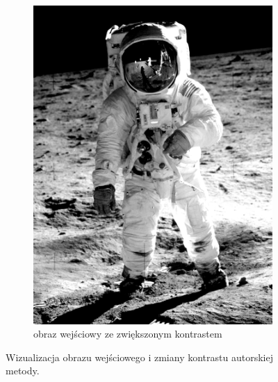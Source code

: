 \begin{figure}[htb]
\begin{subfigure}{0.49\textwidth}
            \includegraphics[width = \textwidth]{img/4-mine/input-input_c20.png}
            \caption{obraz wejściowy ze zwiększonym kontrastem}
            \label{mine-input-1-b}
        \end{subfigure}
        \caption{Wizualizacja obrazu wejściowego i zmiany kontrastu autorskiej metody.}
        \label{mine-input-1}
    \end{figure}
        
